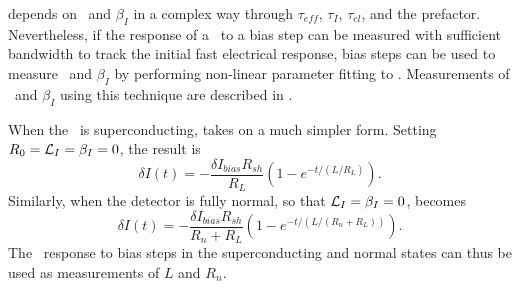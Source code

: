  depends on \Loop\ and $\beta_I$ in a complex way through $\tau_{eff}$, $\tau_I$, $\tau_{el}$, and the prefactor.
Nevertheless, if the response of a \TES\ to a bias step can be measured with sufficient bandwidth to track the initial fast electrical response, bias steps can be used to measure \Loop\ and $\beta_I$ by performing non-linear parameter fitting to .
Measurements of \Loop\ and $\beta_I$ using this technique are described in .

When the \TES\ is superconducting,  takes on a much simpler form.
Setting $R_0 = \mathcal{L}_I = \beta_I = 0$, the result is
\begin{equation}\label{eqn:bias-step-resp-sc}
\delta I(t)
   = - \frac{\delta I_{bias} R_{sh}}{R_{L}} 
       \left(1 - e^{-t/(L/R_L)} \right).
\end{equation}
Similarly, when the detector is fully normal, so that $\mathcal{L}_I = \beta_I = 0$,  becomes
\begin{equation}\label{eqn:bias-step-resp-normal}
\delta I(t)
   = - \frac{\delta I_{bias} R_{sh}}{R_n + R_{L}} 
       \left(1 - e^{-t/(L/(R_n+R_L))} \right).
\end{equation}
The \TES\ response to bias steps in the superconducting and normal states can thus be used as measurements of $L$ and $R_n$.

